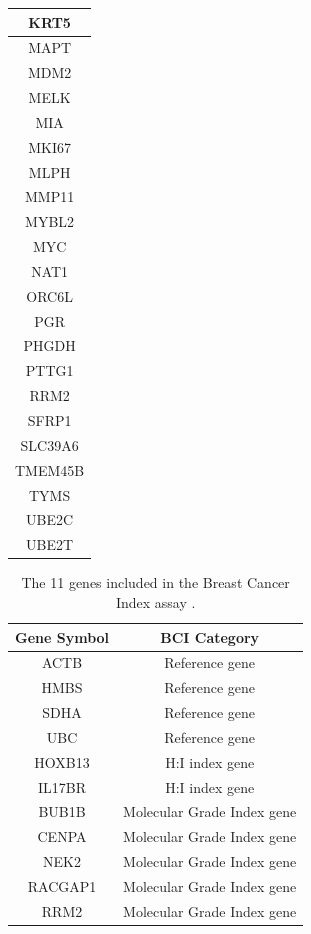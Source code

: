 \begin{table}[!htb]
\begin{tabular}{|c|}
KRT5 \\ 
\hline 
MAPT \\ 
\hline 
MDM2 \\ 
\hline 
MELK \\
\hline 
MIA \\
\hline
MKI67 \\ 
\hline 
MLPH \\ 
\hline 
MMP11 \\ 
\hline 
MYBL2 \\ 
\hline 
MYC \\ 
\hline 
NAT1 \\
\hline 
ORC6L \\
\hline
PGR \\ 
\hline 
PHGDH \\
\hline
PTTG1 \\
\hline
RRM2 \\
\hline
SFRP1 \\
\hline
SLC39A6 \\
\hline
TMEM45B \\ 
\hline
TYMS \\
\hline 
UBE2C \\ 
\hline
UBE2T \\
\hline
  \end{tabular}
\end{table}

{\normalsize
\begin{table}[!htb]
\caption{The 11 genes included in the Breast Cancer Index assay \citep{pmid21559019}.}
\center
\begin{tabular}{|c|c|}
\hline
\multicolumn{1}{|c|}{\textbf{Gene Symbol}} & \textbf{BCI Category} \\ 
\hline
ACTB & Reference gene  \\
HMBS & Reference gene \\
SDHA & Reference gene \\
UBC & Reference gene \\ 
\hline
HOXB13 & H:I index gene \\
IL17BR & H:I index gene \\
\hline 
BUB1B & Molecular Grade Index gene \\
CENPA & Molecular Grade Index gene \\
NEK2 & Molecular Grade Index gene \\
RACGAP1 & Molecular Grade Index gene \\
RRM2 & Molecular Grade Index gene \\
\hline
\end{tabular}
\label{BCI_GS}
\end{table}
}
\FloatBarrier
